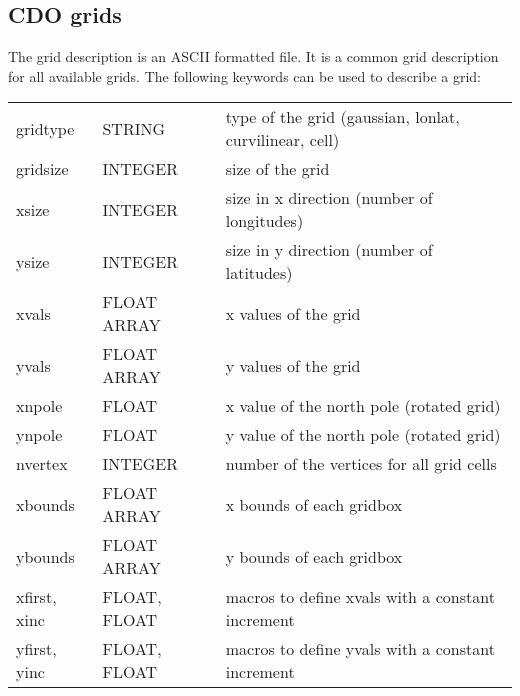 \subsection{CDO grids}

The \CDO grid description is an ASCII formatted file.
It is a common grid description for all available grids.
The following keywords can be used to describe a grid:

\vspace{3mm}
\begin{tabular}[b]{lll}
gridtype     & STRING       & type of the grid (gaussian, lonlat, curvilinear, cell) \\
gridsize     & INTEGER      & size of the grid \\
xsize        & INTEGER      & size in x direction (number of longitudes) \\
ysize        & INTEGER      & size in y direction (number of latitudes) \\
xvals        & FLOAT ARRAY  & x values of the grid \\
yvals        & FLOAT ARRAY  & y values of the grid \\
xnpole       & FLOAT        & x value of the north pole (rotated grid) \\
ynpole       & FLOAT        & y value of the north pole (rotated grid) \\
nvertex      & INTEGER      & number of the vertices for all grid cells \\
xbounds      & FLOAT ARRAY  & x bounds of each gridbox \\
ybounds      & FLOAT ARRAY  & y bounds of each gridbox \\
xfirst, xinc & FLOAT, FLOAT & macros to define xvals with a constant increment \\
yfirst, yinc & FLOAT, FLOAT & macros to define yvals with a constant increment \\
\end{tabular}

